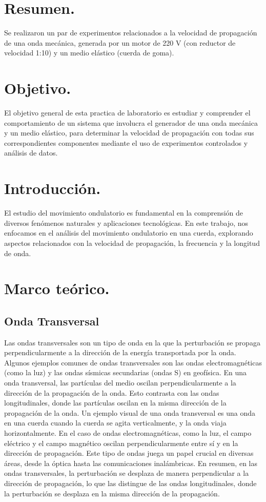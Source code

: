 \documentclass[10pt]{article}
\begin{document}
\section{Resumen.}

Se realizaron un par de experimentos relacionados a la velocidad de propagación de una onda mecánica, generada por un motor de 220 V (con reductor de velocidad 1:10) y un medio elástico (cuerda de goma). 
\begin{multicols}{2}

\section{Objetivo.}
El objetivo general de esta practica de laboratorio es estudiar y comprender el comportamiento de un sistema que involucra el generador de una onda mecánica y un medio elástico, para determinar la velocidad de propagación con todas sus correspondientes componentes mediante el uso de experimentos controlados y análisis de datos.


\section{Introducción.}
El estudio del movimiento ondulatorio es fundamental en la comprensión de diversos fenómenos naturales y aplicaciones tecnológicas. En este trabajo, nos enfocamos en el análisis del movimiento ondulatorio en una cuerda, explorando aspectos relacionados con la velocidad de propagación, la frecuencia y la longitud de onda.



\section{Marco teórico.}

\subsection{Onda Transversal}
Las ondas transversales son un tipo de onda en la que la perturbación se propaga perpendicularmente a la dirección de la energía transportada por la onda. Algunos ejemplos comunes de ondas transversales son las ondas electromagnéticas (como la luz) y las ondas sísmicas secundarias (ondas S) en geofísica.
En una onda transversal, las partículas del medio oscilan perpendicularmente a la dirección de la propagación de la onda. Esto contrasta con las ondas longitudinales, donde las partículas oscilan en la misma dirección de la propagación de la onda. Un ejemplo visual de una onda transversal es una onda en una cuerda cuando la cuerda se agita verticalmente, y la onda viaja horizontalmente.
En el caso de ondas electromagnéticas, como la luz, el campo eléctrico y el campo magnético oscilan perpendicularmente entre sí y en la dirección de propagación. Este tipo de ondas juega un papel crucial en diversas áreas, desde la óptica hasta las comunicaciones inalámbricas.
En resumen, en las ondas transversales, la perturbación se desplaza de manera perpendicular a la dirección de propagación, lo que las distingue de las ondas longitudinales, donde la perturbación se desplaza en la misma dirección de la propagación.

\end{multicols}
\end{document}
